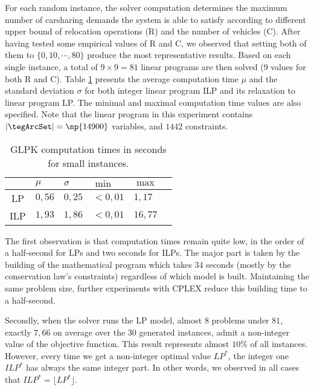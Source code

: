 \begin{bibunit}[ieeetr]
For each random instance, the solver computation determines the maximum number of carsharing demands the system is able to satisfy according to different upper bound of relocation operations (R) and the number of vehicles (C).
After having tested some empirical values of R and C, we observed that setting both of them to $\{0, 10, \cdots, 80\}$ produce the most representative results.
Based on each single instance, a total of $9 \times 9 = 81$ linear programs are then solved (9 values for both R and C).
Table \ref{table:computationTimes} presents the average computation time $\mu$ and the standard deviation $\sigma$ for both integer linear program ILP and its relaxation to linear program LP.
The minimal and maximal computation time values are also specified.
Note that the linear program in this experiment contains $|\tegArcSet| = \np{14900}$ variables, and  $1442$ constraints.

\begin{table}[t]
\renewcommand{\arraystretch}{2.3}
\centering
\begin{tabularx}{.8\linewidth}{|c|*{5}{>{\centering \arraybackslash}X|}}
\cline{2-5}
\multicolumn{1}{c|}{} & $\mu$ & $\sigma$ & $\min$ & $\max$ \\
\hline
LP  & $0,56$ & $0,25$ &	$<0,01$ &  $1,17$ \\
ILP & $1,93$ & $1,86$ &	$<0,01$ & $16,77$ \\
\hline
\end{tabularx}
\caption{GLPK computation times in seconds for small instances.}
\label{table:computationTimes}
\end{table}

\bigskip
The first observation is that computation times remain quite low, in the order of a half-second for LPs and two seconds for ILPs.
The major part is taken by the building of the mathematical program which takes $34$ seconds (mostly  by the conservation law's constraints) regardless of which model is built.
Maintaining the same problem size, further experiments with CPLEX reduce this building time to a half-second.

\bigskip
Secondly, when the solver runs the LP model, almost $8$ problems under $81$, exactly $7,66$ on average over the $30$ generated instances, admit a non-integer value of the objective function.
This result represents almost $10\%$ of all instances.
However, every time we get a non-integer optimal value $LP^*$, the integer one $ILP^*$ has always the same integer part.
In other words, we observed in all cases that $ILP^* = \lfloor LP^* \rfloor$.


\end{bibunit}
